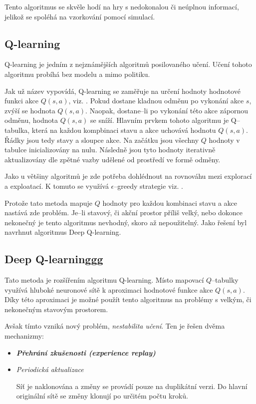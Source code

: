 Tento algoritmus se skvěle hodí na hry s nedokonalou či neúplnou informací, jelikož se spoléhá na vzorkování pomocí simulací.

\subsection{Q-learning}\label{subsec:q-learning}

Q-learning je jedním z nejznámějších algoritmů posilovaného učení.
Učení tohoto algoritmu probíhá bez modelu a mimo politiku.

Jak už název vypovídá, Q-learning se zaměřuje na určení hodnoty hodnotové funkci akce $Q(s, a)$, viz. .
Pokud dostane kladnou odměnu po vykonání akce $s$, zvýší se hodnota $Q(s, a)$.
Naopak, dostane--li po vykonání této akce zápornou odměnu, hodnota $Q(s, a)$ se sníží.
Hlavním prvkem tohoto algoritmu je Q--tabulka, která na každou kompbinaci stavu a akce uchovává hodnotu $Q(s, a)$.
Řádky jsou tedy stavy a sloupce akce.
Na začátku jsou všechny $Q$ hodnoty v tabulce inicializovány na nulu.
Následně jsou tyto hodnoty iterativně aktualizovány dle zpětné vazby udělené od prostředí ve formě odměny.

Jako u většiny algoritmů je zde potřeba dohlédnout na rovnováhu mezi explorací a exploatací.
K tomuto se využívá $\epsilon$--greedy strategie viz. .

Protože tato metoda mapuje $Q$ hodnoty pro každou kombinaci stavu a akce nastává zde problém.
Je--li stavový, či akční prostor příliš velký, nebo dokonce nekonečný je tento algoritmus nevhodný, skoro až nepoužitelný.
Jako řešení byl navrhnut algoritmus Deep Q-learning.

\subsection{Deep Q-learninggg}\label{subsec:deep-q-learninggg}

Tato metoda je rozšířením algoritmu Q-learning.
Místo mapovací $Q$--tabulky využívá hluboké neuronové sítě k aproximaci hodnotové funkce akce $Q(s, a)$.
Díky této aproximaci je možné použít tento algoritmus na problémy s velkým, či nekonečným stavovým prostorem.

Avšak tímto vzniká nový problém, \emph{nestabilita učení}.
Ten je řešen dvěma mechanizmy:

\begin{itemize}
  \item \textbf{\emph{Přehrání zkušenosti (experience replay)}}
  

  \item \emph{Periodická aktualizace}

  Síť je naklonována a změny se provádí pouze na duplikátní verzi.
  Do hlavní originální sítě se změny klonují po určitém počtu kroků.


\end{itemize}

